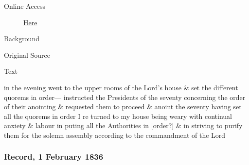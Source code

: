 				\begin{description}
					\item[Online Access] \href{https://www.josephsmithpapers.org/paper-summary/journal-1835-1836/149}{Here}
				\end{description}
				
				\begin{description}
					\item[Background]
				\end{description}
				
				
				\begin{description}
					\item[Original Source]
				\end{description}
				
				
				\begin{description}
					\item[Text]
				\end{description}
				
					in the evening went to the upper rooms of the Lord's house \& set the different quorems in order--- instructed the Presidents of the seventy concerning the order of their anointing \& requested them to proceed \& anoint the seventy having set all the quorems in order I re turned to my house being weary with continual anxiety \& labour in puting all the Authorities in [order?] \& in striving to purify them for the solemn assembly according to the commandment of the Lord
					
		\subsubsection{Record, 1 February 1836}
			\label{EMS-1836-JS-1-FEB-1836}
			
